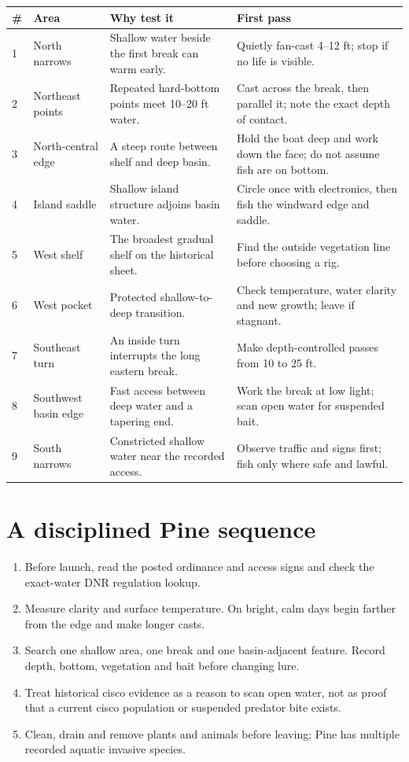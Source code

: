 \begin{longtable}{@{}p{.04\linewidth}p{.19\linewidth}p{.34\linewidth}p{.37\linewidth}@{}}
\toprule
\# & \textbf{Area} & \textbf{Why test it} & \textbf{First pass}\\
\midrule\endhead
1 & North narrows & Shallow water beside the first break can warm early. &
 Quietly fan-cast 4--12 ft; stop if no life is visible.\\
2 & Northeast points & Repeated hard-bottom points meet 10--20 ft water. &
 Cast across the break, then parallel it; note the exact depth of contact.\\
3 & North-central edge & A steep route between shelf and deep basin. &
 Hold the boat deep and work down the face; do not assume fish are on bottom.\\
4 & Island saddle & Shallow island structure adjoins basin water. &
 Circle once with electronics, then fish the windward edge and saddle.\\
5 & West shelf & The broadest gradual shelf on the historical sheet. &
 Find the outside vegetation line before choosing a rig.\\
6 & West pocket & Protected shallow-to-deep transition. &
 Check temperature, water clarity and new growth; leave if stagnant.\\
7 & Southeast turn & An inside turn interrupts the long eastern break. &
 Make depth-controlled passes from 10 to 25 ft.\\
8 & Southwest basin edge & Fast access between deep water and a tapering end. &
 Work the break at low light; scan open water for suspended bait.\\
9 & South narrows & Constricted shallow water near the recorded access. &
 Observe traffic and signs first; fish only where safe and lawful.\\
\bottomrule
\end{longtable}

\section{A disciplined Pine sequence}

\begin{enumerate}
\item Before launch, read the posted ordinance and access signs and check the
exact-water DNR regulation lookup.
\item Measure clarity and surface temperature. On bright, calm days begin
farther from the edge and make longer casts.
\item Search one shallow area, one break and one basin-adjacent feature. Record
depth, bottom, vegetation and bait before changing lure.
\item Treat historical cisco evidence as a reason to scan open water, not as
proof that a current cisco population or suspended predator bite exists.
\item Clean, drain and remove plants and animals before leaving; Pine has
multiple recorded aquatic invasive species.
\end{enumerate}

